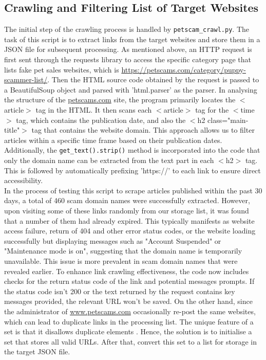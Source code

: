 \documentclass[ oneside,%
                    author={Cassie Qing Tang},
                    degree={BSc},
                     title={The Report for 3D Modelling of Queens Library \\ },
                    subtitle={ }]{dissertation}
\begin{document}
\subsection{Crawling and Filtering List of Target Websites}
The initial step of the crawling process is handled by \texttt{petscam\_crawl.py}. The task of this script is to extract links from the target websites and store them in a JSON file for subsequent processing. As mentioned above, an HTTP request is first sent through the requests library to access the specific category page that lists fake pet sales websites, which is \url{https://petscams.com/category/puppy-scammer-list/}. Then the HTML source code obtained by the request is passed to a BeautifulSoup object and parsed with 'html.parser' as the parser. In analysing the structure of the \url{petscams.com} site, the program primarily locates the $<$article$>$ tag in the HTML. It then scans each $<$article$>$ tag for the $<$time$>$ tag, which contains the publication date, and also the $<$h2 class="main-title"$>$ tag that contains the website domain. This approach allows us to filter articles within a specific time frame based on their publication dates. Additionally, the \texttt{get\_text().strip()} method is incorporated into the code that only the domain name can be extracted from the text part in each $<$h2$>$ tag. This is followed by automatically prefixing 'https://' to each link to ensure direct accessibility.
\\

In the process of testing this script to scrape articles published within the past 30 days, a total of 460 scam domain names were successfully extracted. However, upon visiting some of these links randomly from our storage list, it was found that a number of them had already expired. This typically manifests as website access failure, return of 404 and other error status codes, or the website loading successfully but displaying messages such as "Account Suspended" or "Maintenance mode is on", suggesting that the domain name is temporarily unavailable. This issue is more prevalent in scam domain names that were revealed earlier. To enhance link crawling effectiveness, the code now includes checks for the return status code of the link and potential messages prompts. If the status code isn't 200 or the text returned by the request contains key messages provided, the relevant URL won't be saved. On the other hand, since the administrator of \url{www.petscams.com} occasionally re-post the same websites, which can lead to duplicate links in the processing list. The unique feature of a set is that it disallows duplicate elements \cite{sturtz_sets_nodate}. Hence, the solution is to initialise a set that stores all valid URLs. After that, convert this set to a list for storage in the target JSON file.
\\
\end{document}
